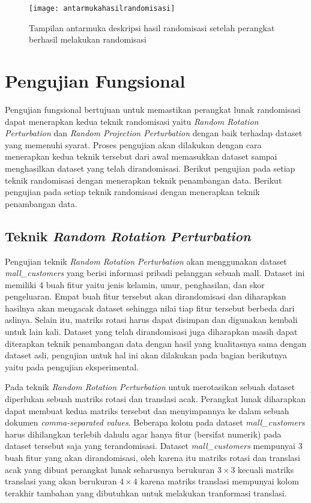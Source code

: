 \begin{figure}
	\centering
	\texttt{[image: antarmukahasilrandomisasi]}
	\caption{Tampilan antarmuka deskripsi hasil randomisasi setelah perangkat berhasil melakukan randomisasi}
	\label{fig:antarmukahasilrandomisasi}
\end{figure}

\section{Pengujian Fungsional}
\label{sec:pengujianfungsional}

Pengujian fungsional bertujuan untuk memastikan perangkat lunak randomisasi dapat menerapkan kedua teknik randomisasi yaitu \textit{Random Rotation Perturbation} dan \textit{Random Projection Perturbation} dengan baik terhadap dataset yang memenuhi syarat. Proses pengujian akan dilakukan dengan cara menerapkan kedua teknik tersebut dari awal memasukkan dataset sampai menghasilkan dataset yang telah dirandomisasi. Berikut pengujian pada setiap teknik randomisasi dengan menerapkan teknik penambangan data. Berikut pengujian pada setiap teknik randomisasi dengan menerapkan teknik penambangan data.

\subsection{Teknik \textit{Random Rotation Perturbation}}
\label{subsec:rrp-fungsional}

Pengujian teknik \textit{Random Rotation Perturbation} akan menggunakan dataset \textit{mall\_customers} yang berisi informasi pribadi pelanggan sebuah mall. Dataset ini memiliki 4 buah fitur yaitu jenis kelamin, umur, penghasilan, dan skor pengeluaran. Empat buah fitur tersebut akan dirandomisasi dan diharapkan hasilnya akan mengacak dataset sehingga nilai tiap fitur tersebut berbeda dari aslinya. Selain itu, matriks rotasi harus dapat disimpan dan digunakan kembali untuk lain kali. Dataset yang telah dirandomisasi juga diharapkan masih dapat diterapkan teknik penambangan data dengan hasil yang kualitasnya sama dengan dataset asli, pengujian untuk hal ini akan dilakukan pada bagian berikutnya yaitu pada pengujian eksperimental.

Pada teknik \textit{Random Rotation Perturbation} untuk merotasikan sebuah dataset diperlukan sebuah matriks rotasi dan translasi acak. Perangkat lunak diharapkan dapat membuat kedua matriks tersebut dan menyimpannya ke dalam sebuah dokumen \textit{comma-separated values}. Beberapa kolom pada dataset \textit{mall\_customers} harus dihilangkan terlebih dahulu agar hanya fitur (bersifat numerik) pada dataset tersebut saja yang terandomisasi. Dataset \textit{mall\_customers} mempunyai 3 buah fitur yang akan dirandomisasi, oleh karena itu matriks rotasi dan translasi acak yang dibuat perangkat lunak seharusnya berukuran \(3\times3\) kecuali matriks translasi yang akan berukuran \(4\times4\) karena matriks translasi mempunyai kolom terakhir tambahan yang dibutuhkan untuk melakukan tranformasi translasi. 

